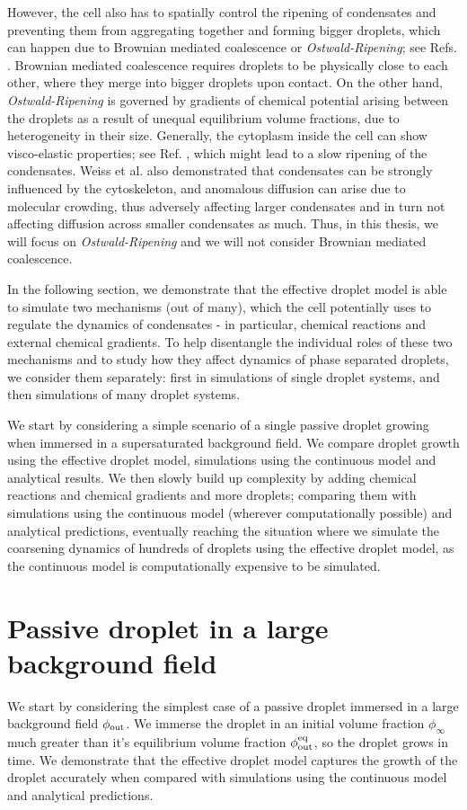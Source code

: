 However, the cell also has to spatially control the ripening of condensates and preventing them from aggregating together and forming bigger droplets, which can happen due to Brownian mediated coalescence or \textit{Ostwald-Ripening}; see Refs. \cite{Review2019,Weber2017}.
Brownian mediated coalescence requires droplets to be physically close to each other, where they merge into bigger droplets upon contact. 
On the other hand, \textit{Ostwald-Ripening} is governed by gradients of chemical potential arising between the droplets as a result of unequal equilibrium volume fractions, due to heterogeneity in their size.
Generally, the cytoplasm inside the cell can show visco-elastic properties; see Ref. \cite {Xie2022}, which might lead to a slow ripening of the condensates.
Weiss et al. \cite{Weiss2004} also demonstrated that condensates can be strongly influenced by the cytoskeleton, and anomalous diffusion can arise due to molecular crowding, thus adversely affecting larger condensates and in turn not affecting diffusion across smaller condensates as much.
Thus, in this thesis, we will focus on \textit{Ostwald-Ripening} and we will not consider Brownian mediated coalescence. 

In the following section, we demonstrate that the effective droplet model is able to simulate two mechanisms (out of many), which the cell potentially uses to regulate the dynamics of condensates - in particular, chemical reactions and external chemical gradients.
To help disentangle the individual roles of these two mechanisms and to study how they affect dynamics of phase separated droplets, we consider them separately: first in simulations of single droplet systems, and then simulations of many droplet systems. 

We start by considering a simple scenario of a single passive droplet growing when immersed in a supersaturated background field.
We compare droplet growth using the effective droplet model, simulations using the continuous model and analytical results.
We then slowly build up complexity by adding chemical reactions and chemical gradients and more droplets; comparing them with simulations using the continuous model (wherever computationally possible) and analytical predictions, eventually reaching the situation where we simulate the coarsening dynamics of hundreds of droplets using the effective droplet model, as the continuous model is computationally expensive to be simulated.

\section{Passive droplet in a large background field}
We start by considering the simplest case of a passive droplet immersed in a large background field $\phi_\mathrm{out}$.
We immerse the droplet in an initial volume fraction $\phi_\infty$ much greater than it's equilibrium volume fraction $\phi^\mathrm{eq}_\mathrm{out}$, so the droplet grows in time. 
We demonstrate that the effective droplet model captures the growth of the droplet accurately when compared with simulations using the continuous model and analytical predictions.

